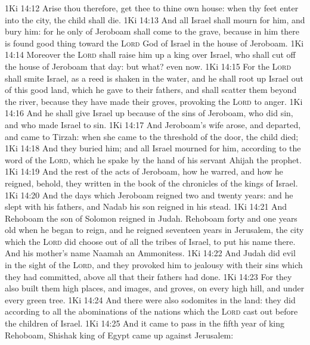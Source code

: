 \vs 1Ki 14:12 Arise thou therefore, get thee to thine own house:  when thy feet enter into the city, the child shall die.
\vs 1Ki 14:13 And all Israel shall mourn for him, and bury him: for he only of Jeroboam shall come to the grave, because in him there is found  good thing toward the \textsc{Lord} God of Israel in the house of Jeroboam.
\vs 1Ki 14:14 Moreover the \textsc{Lord} shall raise him up a king over Israel, who shall cut off the house of Jeroboam that day: but what? even now.
\vs 1Ki 14:15 For the \textsc{Lord} shall smite Israel, as a reed is shaken in the water, and he shall root up Israel out of this good land, which he gave to their fathers, and shall scatter them beyond the river, because they have made their groves, provoking the \textsc{Lord} to anger.
\vs 1Ki 14:16 And he shall give Israel up because of the sins of Jeroboam, who did sin, and who made Israel to sin.
\vs 1Ki 14:17 And Jeroboam's wife arose, and departed, and came to Tirzah:  when she came to the threshold of the door, the child died;
\vs 1Ki 14:18 And they buried him; and all Israel mourned for him, according to the word of the \textsc{Lord}, which he spake by the hand of his servant Ahijah the prophet.
\vs 1Ki 14:19 And the rest of the acts of Jeroboam, how he warred, and how he reigned, behold, they  written in the book of the chronicles of the kings of Israel.
\vs 1Ki 14:20 And the days which Jeroboam reigned  two and twenty years: and he slept with his fathers, and Nadab his son reigned in his stead.
\vs 1Ki 14:21 And Rehoboam the son of Solomon reigned in Judah. Rehoboam  forty and one years old when he began to reign, and he reigned seventeen years in Jerusalem, the city which the \textsc{Lord} did choose out of all the tribes of Israel, to put his name there. And his mother's name  Naamah an Ammonitess.
\vs 1Ki 14:22 And Judah did evil in the sight of the \textsc{Lord}, and they provoked him to jealousy with their sins which they had committed, above all that their fathers had done.
\vs 1Ki 14:23 For they also built them high places, and images, and groves, on every high hill, and under every green tree.
\vs 1Ki 14:24 And there were also sodomites in the land:  they did according to all the abominations of the nations which the \textsc{Lord} cast out before the children of Israel.
\vs 1Ki 14:25 And it came to pass in the fifth year of king Rehoboam,  Shishak king of Egypt came up against Jerusalem:
